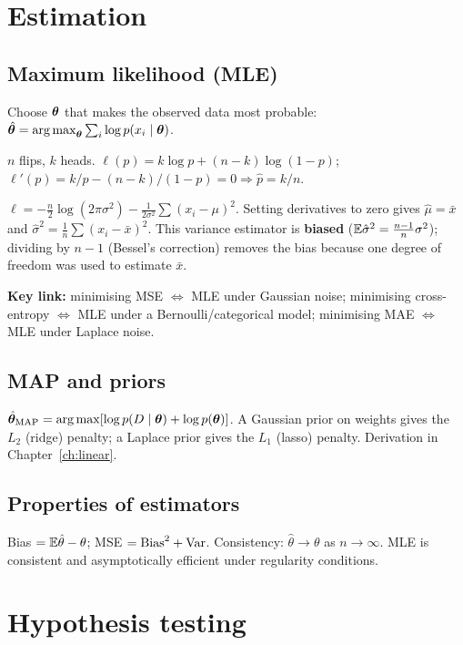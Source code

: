 \section{Estimation}

\subsection{Maximum likelihood (MLE)}
Choose $\bm{\theta}$ that makes the observed data most probable: $\hat{\bm{\theta}}=\operatorname*{arg\,max}_{\bm{\theta}}\sum_i\log p(x_i\mid\bm{\theta})$.

\begin{example}
$n$ flips, $k$ heads. $\ell(p)=k\log p+(n-k)\log(1-p)$; $\ell'(p)=k/p-(n-k)/(1-p)=0\Rightarrow\hat p=k/n$.
\end{example}

\begin{example}
$\ell=-\frac n2\log(2\pi\sigma^2)-\frac1{2\sigma^2}\sum(x_i-\mu)^2$. Setting derivatives to zero gives $\hat\mu=\bar x$ and $\hat\sigma^2=\frac1n\sum(x_i-\bar x)^2$. This variance estimator is \textbf{biased} ($\mathbb{E}\hat\sigma^2=\frac{n-1}n\sigma^2$); dividing by $n-1$ (Bessel's correction) removes the bias because one degree of freedom was used to estimate $\bar x$.
\end{example}

\textbf{Key link:} minimising MSE $\Leftrightarrow$ MLE under Gaussian noise; minimising cross-entropy $\Leftrightarrow$ MLE under a Bernoulli/categorical model; minimising MAE $\Leftrightarrow$ MLE under Laplace noise.

\subsection{MAP and priors}
$\hat{\bm{\theta}}_{\text{MAP}}=\operatorname*{arg\,max}[\log p(D\mid\bm{\theta})+\log p(\bm{\theta})]$. A Gaussian prior on weights gives the $L_2$ (ridge) penalty; a Laplace prior gives the $L_1$ (lasso) penalty. Derivation in Chapter~\ref{ch:linear}.

\subsection{Properties of estimators}
Bias $=\mathbb{E}\hat\theta-\theta$; MSE $=\text{Bias}^2+\operatorname{Var}$. Consistency: $\hat\theta\to\theta$ as $n\to\infty$. MLE is consistent and asymptotically efficient under regularity conditions.

\section{Hypothesis testing}

